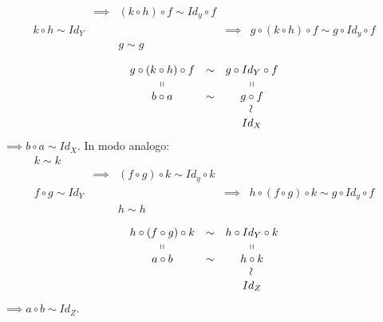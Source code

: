 \begin{demonstration}
\begin{itemize}
\begin{equation*}
\begin{array}{cccccc}
			& \implies & \left(k\circ h\right)\circ f\sim Id_y\circ f& &\\
			k\circ h\sim Id_Y& & &\implies &g\circ \left(k\circ h\right)\circ f\sim g\circ Id_y\circ f \\
			& & g\sim g & &\\
		\end{array}
	\end{equation*}
	\begin{equation*}
	\begin{array}{ccc}
		g\circ \left(k\circ h\right)\circ f& \sim & g\circ Id_Y\circ f\\
		\shortparallel & & \shortparallel\\
		b\circ a & \sim & g\circ f\\
		& & \rotatebox{90}{$\sim$}\\
		& & Id_X
	\end{array}
	\end{equation*}
$\implies b\circ a\sim Id_X$. In modo analogo:
\begin{equation*}
	\begin{array}{cccccc}
		k\sim k & & & &\\
		& \implies & \left(f\circ g\right)\circ k\sim Id_y\circ k& &\\
		f\circ g\sim Id_Y& & &\implies &h\circ \left(f\circ g\right)\circ k\sim g\circ Id_y\circ f \\
		& & h\sim h & &\\
	\end{array}
\end{equation*}
\begin{equation*}
	\begin{array}{ccc}
		h\circ \left(f\circ g\right)\circ k& \sim & h\circ Id_Y\circ k\\
		\shortparallel & & \shortparallel\\
		a\circ b & \sim & h\circ k\\
		& & \rotatebox{90}{$\sim$}\\
		& & Id_Z
	\end{array}
\end{equation*}
$\implies a\circ b\sim Id_Z$.
\end{itemize}
\vspace{-3mm}
\end{demonstration}
